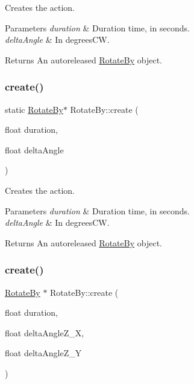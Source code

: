 Creates the action.


\begin{DoxyParams}{Parameters}
{\em duration} & Duration time, in seconds. \\
\hline
{\em delta\+Angle} & In degrees\+CW. \\
\hline
\end{DoxyParams}
\begin{DoxyReturn}{Returns}
An autoreleased \hyperlink{classRotateBy}{Rotate\+By} object. 
\end{DoxyReturn}
\mbox{\label{classRotateBy_a02ff87da50beb34e1da4b3f59dd69b6c}} 
\subsubsection{\texorpdfstring{create()}{create()}\hspace{0.1cm}{\footnotesize\ttfamily [2/6]}}
{\footnotesize\ttfamily static \hyperlink{classRotateBy}{Rotate\+By}$\ast$ Rotate\+By\+::create (\begin{DoxyParamCaption}\item[{float}]{duration,  }\item[{float}]{delta\+Angle }\end{DoxyParamCaption})\hspace{0.3cm}{\ttfamily [static]}}

Creates the action.


\begin{DoxyParams}{Parameters}
{\em duration} & Duration time, in seconds. \\
\hline
{\em delta\+Angle} & In degrees\+CW. \\
\hline
\end{DoxyParams}
\begin{DoxyReturn}{Returns}
An autoreleased \hyperlink{classRotateBy}{Rotate\+By} object. 
\end{DoxyReturn}
\mbox{\label{classRotateBy_a71ac0001ee6219e749d6d21e631f6fa3}} 
\subsubsection{\texorpdfstring{create()}{create()}\hspace{0.1cm}{\footnotesize\ttfamily [3/6]}}
{\footnotesize\ttfamily \hyperlink{classRotateBy}{Rotate\+By} $\ast$ Rotate\+By\+::create (\begin{DoxyParamCaption}\item[{float}]{duration,  }\item[{float}]{delta\+Angle\+Z\+\_\+X,  }\item[{float}]{delta\+Angle\+Z\+\_\+Y }\end{DoxyParamCaption})\hspace{0.3cm}{\ttfamily [static]}}

